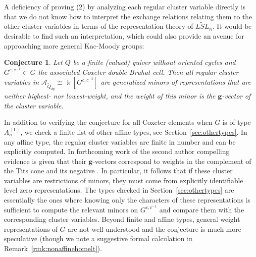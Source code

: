 \documentclass[12pt]{amsart}
\newcommand{\sayHW}[1]{\say[HW]{\color{violet}{\bf HW:}\;#1}}
\newcommand{\sayDR}[1]{\say[DR]{\color{red}{\bf DR:}\;#1}}
\newcommand{\cA}{\mathcal{A}}
\newcommand{\kk}{\Bbbk}
\newcommand{\bfg}{\mathbf{g}}
\newcommand{\Qdp}{\widetilde{Q}_{dp}}
\newtheorem{conjecture}[theorem]{Conjecture}
\theoremstyle{remark}
\numberwithin{equation}{section}
\numberwithin{figure}{section}
\begin{document}
A deficiency of proving (2) by analyzing each regular cluster variable directly is that we do not know how to interpret the exchange relations relating them to the other cluster variables in terms of the representation theory of $\widetilde{LSL}_n$.
It would be desirable to find such an interpretation, which could also provide an avenue for approaching more general Kac-Moody groups:

\begin{conjecture}
\label{conj:mainconjecture}
  Let $Q$ be a finite (valued) quiver without oriented cycles and $G^{c,c^{-1}} \subset G$ the associated Coxeter double Bruhat cell.
  Then all regular cluster variables in  $\cA_{\Qdp} \cong \kk[G^{c,c^{-1}}]$ are generalized minors of representations that are neither highest- nor lowest-weight, and the weight of this minor is the $\bfg$-vector of the cluster variable.
\end{conjecture}

In addition to verifying the conjecture for all Coxeter elements when $G$ is of type $A_n^{(1)}$, we check a finite list of other affine types, see Section~\ref{sec:othertypes}.
In any affine type, the regular cluster variables are finite in number and can be explicitly computed.
In forthcoming work of the second author compelling evidence is given that their $\bfg$-vectors correspond to weights in the complement of the Tits cone and its negative \cite{RS16}.
In particular, it follows that if these cluster variables are restrictions of minors, they must come from explicitly identifiable level zero representations.
The types checked in Section~\ref{sec:othertypes} are essentially the ones where knowing only the characters of these representations is sufficient to compute the relevant minors on $G^{c,c^{-1}}$ and compare them with the corresponding cluster variables. 
Beyond finite and affine types, general weight representations of $G$ are not well-understood and the conjecture is much more speculative (though we note a suggestive formal calculation in Remark~\ref{rmk:nonaffinehomelt}).
\end{document}
